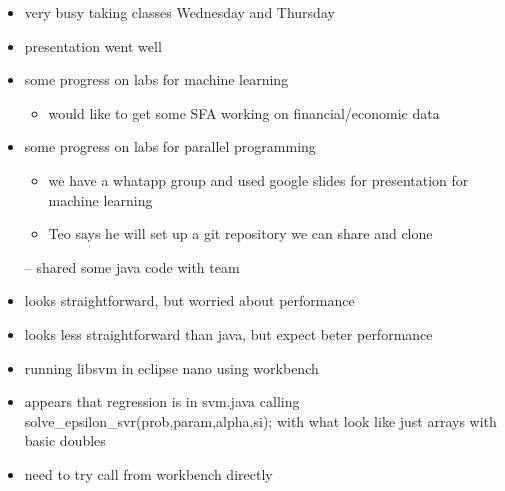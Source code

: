 \documentclass[hyperref]{labbook}
\begin{document}

\begin{itemize}
\item very busy taking classes Wednesday and Thursday
\item presentation went well
\item some progress on labs for machine learning
  \begin{itemize}
  \item would like to get some SFA working on financial/economic data
  \end{itemize}

\item some progress on labs for parallel programming
  \begin{itemize}
  \item we have a whatapp group and used google slides for presentation for machine learning
  \item Teo says he will set up a git repository we can share and clone
  \end{itemize}
  -- shared some java code with team
\end{itemize}

\begin{itemize}
\item looks straightforward, but worried about performance
\end{itemize}


\begin{itemize}
\item looks less straightforward than java, but expect beter performance
\end{itemize}





\begin{itemize}
\item running libsvm in eclipse nano using workbench
\item appears that regression is in svm.java calling
  solve\_epsilon\_svr(prob,param,alpha,si); with what look like just arrays with basic doubles 
\item need to try call from workbench directly
\end{itemize}
\end{document}
